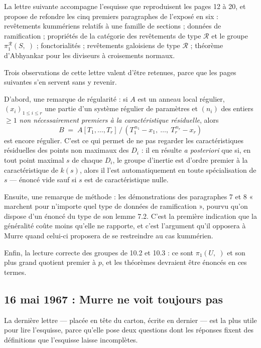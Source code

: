 \documentclass[11pt,a4paper]{article}
\begin{document}
La lettre suivante accompagne l'esquisse que reproduisent les pages 12 à 20, et
propose de refondre les cinq premiers paragraphes de l'exposé en six :
revêtements kummériens relatifs à une famille de sections ; données de
ramification ; propriétés de la catégorie des revêtements de type
$\mathcal{R}$ et le groupe $\pi_{1}^{\mathcal{R}}(S,\;)$ ; fonctorialités ;
revêtements galoisiens de type $\mathcal{R}$ ; théorème d'Abhyankar pour les
diviseurs à croisements normaux.

Trois observations de cette lettre valent d'être retenues, parce que les pages
suivantes s'en servent sans y revenir.

D'abord, une remarque de régularité : si $A$ est un anneau local régulier,
$(x_{i})_{1 \leqslant i \leqslant r}$ une partie d'un système régulier de
paramètres et $(n_{i})$ des entiers $\geqslant 1$ \emph{non nécessairement
premiers à la caractéristique résiduelle}, alors
\[
  B \;=\; A[T_{1},\dots,T_{r}]\,/\,(T_{1}^{\,n_{1}} - x_{1},\ \dots,\
  T_{r}^{\,n_{r}} - x_{r})
\]
est encore régulier. C'est ce qui permet de ne pas regarder les
caractéristiques résiduelles des points non maximaux des $D_{i}$ : il en
résulte \emph{a posteriori} que si, en tout point maximal $s$ de chaque
$D_{i}$, le groupe d'inertie est d'ordre premier à la caractéristique de
$k(s)$, alors il l'est automatiquement en toute spécialisation de $s$ ---
énoncé vide sauf si $s$ est de caractéristique nulle.

Ensuite, une remarque de méthode : les démonstrations des paragraphes 7 et 8
« marchent pour n'importe quel type de données de ramification », pourvu qu'on
dispose d'un énoncé du type de son lemme 7.2. C'est la première indication que
la généralité coûte moins qu'elle ne rapporte, et c'est l'argument qu'il
opposera à Murre quand celui-ci proposera de se restreindre au cas kummérien.

Enfin, la lecture correcte des groupes de 10.2 et 10.3 : ce sont
$\pi_{1}(U,\;)$ et son plus grand quotient premier à $p$, et les théorèmes
devraient être énoncés en ces termes.

\subsection*{16 mai 1967 : Murre ne voit toujours pas}

La dernière lettre --- placée en tête du carton, écrite en dernier --- est la
plus utile pour lire l'esquisse, parce qu'elle pose deux questions dont les
réponses fixent des définitions que l'esquisse laisse incomplètes.
\end{document}
